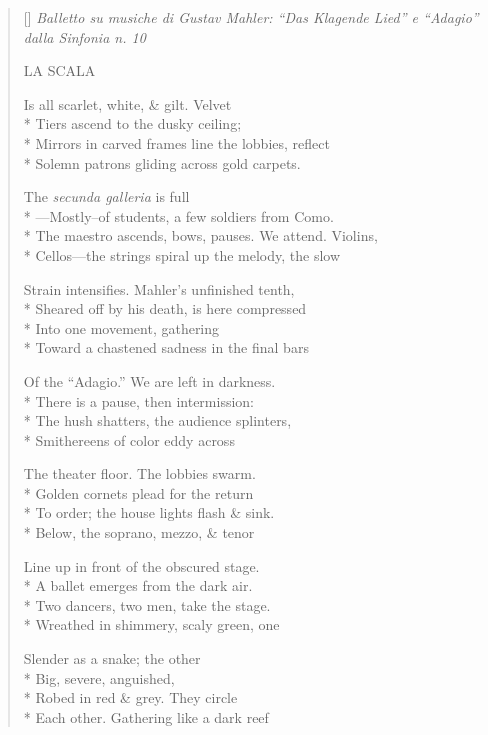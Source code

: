 \label{ch:milano_la_scala}
\settowidth{\versewidth}{Balletto su musiche di Gustav Mahler: “Das Klagende Lied” e “Adagio” dalla Sinfonia n. 10   }
\begin{verse}[\versewidth]
\textit{Balletto su musiche di Gustav Mahler: ``Das Klagende Lied'' e ``Adagio'' dalla Sinfonia n. 10}   

LA SCALA

Is all scarlet, white, \& gilt. Velvet\\*
Tiers ascend to the dusky ceiling;\\*
Mirrors in carved frames line the lobbies, reflect\\*
Solemn patrons gliding across gold carpets.

The \textit{secunda galleria} is full\\*
---Mostly--of students, a few soldiers from Como.\\*
The maestro ascends, bows, pauses. We attend.  Violins,\\*
Cellos---the strings spiral up the melody, the slow

Strain intensifies.  Mahler's unfinished tenth,\\*
Sheared off by his death, is here compressed\\*
Into one movement, gathering\\*
Toward a chastened sadness in the final bars

Of the ``Adagio.'' We are left in darkness.\\*
There is a pause, then intermission:\\*
The hush shatters, the audience splinters,\\*
Smithereens of color eddy across

The theater floor.  The lobbies swarm.\\*
Golden cornets plead for the return\\*
To order; the house lights flash \& sink.\\*
Below, the soprano, mezzo, \& tenor

Line up in front of the obscured stage.\\*
A ballet emerges from the dark air.\\*
Two dancers, two men, take the stage.\\*
Wreathed in shimmery, scaly green, one

Slender as a snake; the other\\*
Big, severe, anguished,\\*
Robed in red \& grey.   They circle\\*
Each other.  Gathering like a dark reef


\end{verse}
